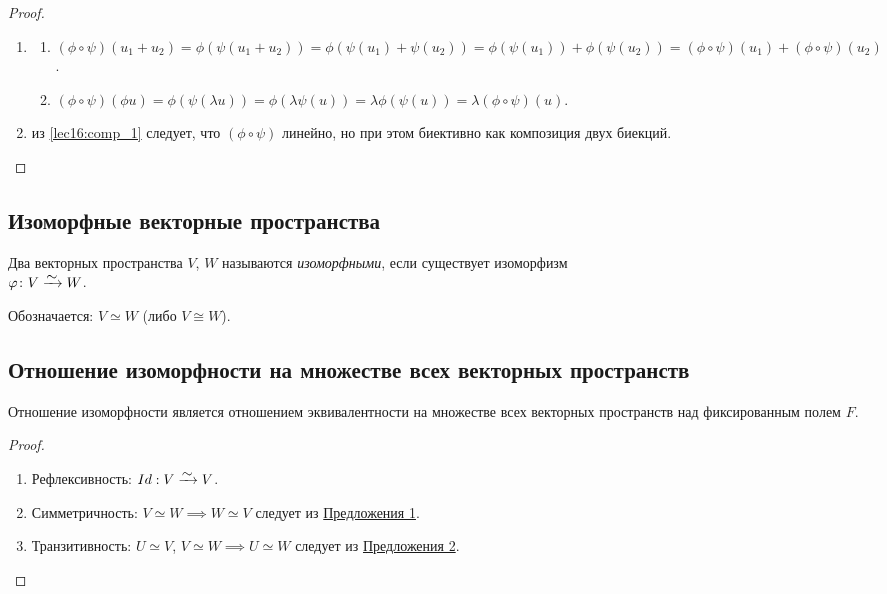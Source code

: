 \begin{proof}~
    \begin{enumerate}
    \item \label{lec16:comp_1}
        \begin{enumerate}[label=(\arabic*)]
            \item $(\phi \circ \psi)(u_1 + u_2) = \phi(\psi(u_1 + u_2)) = \phi(\psi(u_1) + \psi(u_2)) = \phi(\psi(u_1)) + \phi(\psi(u_2)) = (\phi \circ \psi)(u_1) + (\phi \circ \psi)(u_2)$.
            \item $(\phi \circ \psi)(\phi u) = \phi(\psi(\lambda u)) = \phi(\lambda \psi(u)) = \lambda \phi(\psi(u)) = \lambda(\phi \circ \psi)(u)$.
        \end{enumerate}
    \item из \ref{lec16:comp_1} следует, что $(\phi \circ \psi)$ линейно, но при этом биективно как композиция двух биекций.
        \qedhere
    \end{enumerate}
\end{proof}


\subsection{Изоморфные векторные пространства}

\begin{definition}
    Два векторных пространства $V$, $W$ называются \textit{изоморфными}, если существует изоморфизм \\ ${\phi\colon V \MapsTo W}$.

    Обозначается: $V \simeq W$ (либо $V \cong W$).
\end{definition}


\subsection{Отношение изоморфности на множестве всех векторных пространств}

\begin{theorem}
    Отношение изоморфности является отношением эквивалентности на множестве всех векторных пространств над фиксированным полем $F$.
\end{theorem}

\begin{proof}~
    \begin{enumerate}
    \item Рефлексивность: $Id: V \MapsTo V$.
    \item Симметричность: $V \simeq W \implies W \simeq V$ следует из \hyperref[lec16:prop_1]{Предложения 1}.
    \item Транзитивность: $U \simeq V$, $V \simeq W \implies U \simeq W$ следует из \hyperref[lec16:prop_2]{Предложения 2}.
        \qedhere
    \end{enumerate}
\end{proof}


